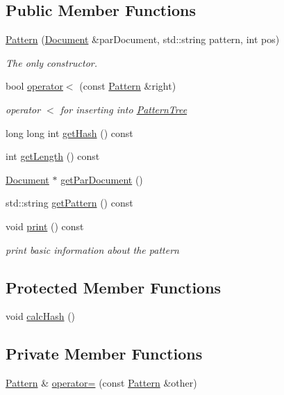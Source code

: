 \subsection*{Public Member Functions}
\begin{DoxyCompactItemize}
\item 
\hyperlink{class_pattern_ada73ecc1fc5e4d94f30a8161feef67cf}{Pattern} (\hyperlink{class_document}{Document} \&parDocument, std::string pattern, int pos)
\begin{DoxyCompactList}\small\item\em The only constructor. \end{DoxyCompactList}\item 
bool \hyperlink{class_pattern_a157a34771b4c550a7cf528f09fa685b5}{operator$<$} (const \hyperlink{class_pattern}{Pattern} \&right)
\begin{DoxyCompactList}\small\item\em operator $<$ for inserting into \hyperlink{class_pattern_tree}{PatternTree} \end{DoxyCompactList}\item 
long long int \hyperlink{class_pattern_ab6c1a23c63162c8e9bc27061e9370ed1}{getHash} () const 
\item 
int \hyperlink{class_pattern_a371d9dad975d97190b969ee6e77178c0}{getLength} () const 
\item 
\hyperlink{class_document}{Document} $\ast$ \hyperlink{class_pattern_aba85629c60347a4f3c81bd7088af4c55}{getParDocument} ()
\item 
std::string \hyperlink{class_pattern_ad4f3ad6d391eea8c6fd95efdf7f7246d}{getPattern} () const 
\item 
void \hyperlink{class_pattern_a44a70e6aff49a25fa068487e3d9f0fa3}{print} () const 
\begin{DoxyCompactList}\small\item\em print basic information about the pattern \end{DoxyCompactList}\end{DoxyCompactItemize}
\subsection*{Protected Member Functions}
\begin{DoxyCompactItemize}
\item 
void \hyperlink{class_pattern_a8c7f0e27f620c00de00d097c84e9d6c3}{calcHash} ()
\end{DoxyCompactItemize}
\subsection*{Private Member Functions}
\begin{DoxyCompactItemize}
\item 
\hyperlink{class_pattern}{Pattern} \& \hyperlink{class_pattern_a69f59394d218d0e476ef9259130e6bef}{operator=} (const \hyperlink{class_pattern}{Pattern} \&other)
\end{DoxyCompactItemize}
